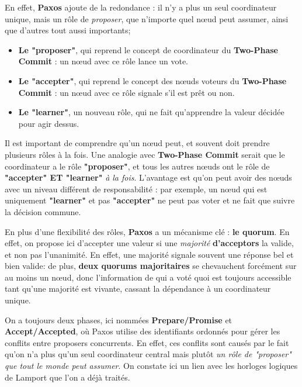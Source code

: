 \documentclass[12pt,a4paper]{article}
\begin{document}
En effet, \textbf{Paxos} ajoute de la redondance : il n'y a plus un seul coordinateur unique, mais un rôle de \textit{proposer}, que n'importe quel nœud peut assumer, ainsi que d'autres tout aussi importants;

\vspace{0.25cm}
\begin{itemize}
    \item \textbf{Le "proposer"}, qui reprend le concept de coordinateur du \textbf{Two-Phase Commit} : un nœud avec ce rôle lance un vote.
    \item \textbf{Le "accepter"}, qui reprend le concept des nœuds voteurs du \textbf{Two-Phase Commit} : un nœud avec ce rôle signale s'il est prêt ou non.
    \item \textbf{Le "learner"}, un nouveau rôle, qui ne fait qu'apprendre la valeur décidée pour agir dessus. 
\end{itemize}
\vspace{0.25cm}

Il est important de comprendre qu'un nœud peut, et souvent doit prendre plusieurs rôles à la fois. Une analogie avec \textbf{Two-Phase Commit} serait que le coordinateur a le rôle \textbf{"proposer"}, et tous les autres nœuds ont le rôle de \textbf{"accepter" ET "learner"} \textit{à la fois}. L'avantage est qu'on peut avoir des nœuds avec un niveau différent de responsabilité : par exemple, un nœud qui est uniquement \textbf{"learner"} et pas \textbf{"accepter"} ne peut pas voter et ne fait que suivre la décision commune.

\vspace{0.25cm}

En plus d'une flexibilité des rôles, \textbf{Paxos} a un mécanisme clé : \textbf{le quorum}. En effet, on propose ici d'accepter une valeur si une \textit{majorité} \textbf{d'acceptors} la valide, et non pas l'unanimité. En effet, une majorité signale souvent une réponse bel et bien valide: de plus, \textbf{deux quorums majoritaires } se chevauchent forcément sur au moins un nœud, donc l'information de qui a voté quoi est toujours accessible tant qu'une majorité est vivante, cassant la dépendance à un coordinateur unique.

\vspace{0.25cm}

On a toujours deux phases, ici nommées \textbf{Prepare/Promise} et \textbf{Accept/Accepted}, où Paxos utilise des identifiants ordonnés pour gérer les conflits entre proposers concurrents. En effet, ces conflits sont causés par le fait qu'on n'a plus qu'un seul coordinateur central mais plutôt \textit{un rôle de "proposer" que tout le monde peut assumer}. On constate ici un lien avec les horloges logiques de Lamport que l'on a déjà traités.
\end{document}
